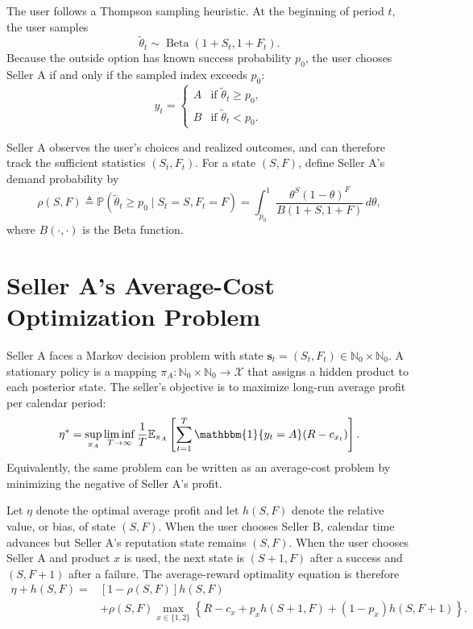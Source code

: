 \documentclass[opre]{informs3}
\newcommand{\E}{\mathbb{E}}
\newcommand{\Pb}{\mathbb{P}}
\newcommand{\Natu}{\mathbb{N}}
\newcommand{\Ind}[1]{\mathbbm{1}\{#1\}}
\newcommand{\Xscr}{\mathcal{X}}
\begin{document}
The user follows a Thompson sampling heuristic. At the beginning of period $t$,
the user samples
\begin{equation}
    \tilde{\theta}_t\sim\operatorname{Beta}(1+S_t,1+F_t).
\end{equation}
Because the outside option has known success probability $p_0$, the user chooses
Seller A if and only if the sampled index exceeds $p_0$:
\begin{equation}
    y_t=
    \begin{cases}
        A & \text{if } \tilde{\theta}_t\geq p_0,\\
        B & \text{if } \tilde{\theta}_t<p_0.
    \end{cases}
    \label{eq:user-policy}
\end{equation}

Seller A observes the user's choices and realized outcomes, and can therefore
track the sufficient statistics $(S_t,F_t)$. For a state $(S,F)$, define
Seller A's demand probability by
\begin{equation}
    \rho(S,F)
    \triangleq
    \Pb(\tilde{\theta}_t\geq p_0\mid S_t=S,F_t=F)
    =
    \int_{p_0}^{1}
    \frac{\theta^S(1-\theta)^F}{B(1+S,1+F)}\,d\theta,
    \label{eq:demand-probability}
\end{equation}
where $B(\cdot,\cdot)$ is the Beta function.

\section{Seller A's Average-Cost Optimization Problem}

Seller A faces a Markov decision problem with state
$\bm{s}_t=(S_t,F_t)\in\Natu_0\times\Natu_0$. A stationary policy is a mapping
$\pi_A:\Natu_0\times\Natu_0\to\Xscr$ that assigns a hidden product to each
posterior state. The seller's objective is to maximize long-run average profit
per calendar period:
\begin{equation}
    \eta^*
    =
    \sup_{\pi_A}
    \liminf_{T\to\infty}
    \frac{1}{T}
    \E_{\pi_A}
    \left[
        \sum_{t=1}^{T}\Ind{y_t=A}(R-c_{x_t})
    \right].
    \label{eq:average-profit}
\end{equation}
Equivalently, the same problem can be written as an average-cost problem by
minimizing the negative of Seller A's profit.

Let $\eta$ denote the optimal average profit and let $h(S,F)$ denote the relative
value, or bias, of state $(S,F)$. When the user chooses Seller B, calendar time
advances but Seller A's reputation state remains $(S,F)$. When the user chooses
Seller A and product $x$ is used, the next state is $(S+1,F)$ after a success and
$(S,F+1)$ after a failure. The average-reward optimality equation is therefore
\begin{equation}
\begin{aligned}
    \eta+h(S,F)
    =
    &[1-\rho(S,F)]h(S,F)\\
    &+\rho(S,F)
    \max_{x\in\{1,2\}}
    \left\{
        R-c_x
        +p_xh(S+1,F)
        +(1-p_x)h(S,F+1)
    \right\}.
\end{aligned}
\label{eq:average-bellman}
\end{equation}
\end{document}
